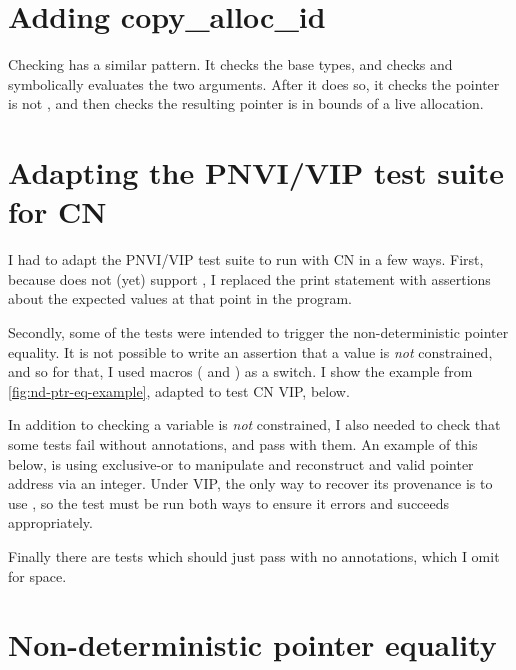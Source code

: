 
\section{Adding copy\_alloc\_id}

Checking  has a similar pattern. It checks the base
types, and checks and symbolically evaluates the two arguments. After it does so,
it checks the pointer is not , and then checks the resulting
pointer is in bounds of a live allocation.


\section{Adapting the PNVI/VIP test suite for CN}

I had to adapt the PNVI/VIP test suite to run with CN in a few ways. First,
because  does not (yet) support , I replaced the print
statement with assertions about the expected values at that point in the
program.

Secondly, some of the tests were intended to trigger the non-deterministic
pointer equality. It is not possible to write an assertion that a value
is \emph{not} constrained, and so for that, I used macros
( and ) as a switch. I show the
example from \cref{fig:nd-ptr-eq-example}, adapted to test CN VIP, below.


In addition to checking a variable is \emph{not} constrained, I also needed to
check that some tests fail without  annotations, and
pass with them. An example of this below, is using exclusive-or to manipulate
and reconstruct and valid pointer address via an integer. Under VIP, the only
way to recover its provenance is to use , so the test
must be run both ways to ensure it errors and succeeds appropriately.


Finally there are tests which should just pass with no annotations, which I
omit for space.

\section{Non-deterministic pointer equality}

